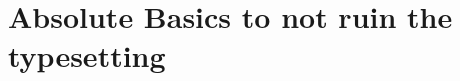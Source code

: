 \documentclass[aspectratio=169]{beamer}
\begin{document}
% 
% 


\section{Absolute Basics to not ruin the typesetting}

\end{document}
